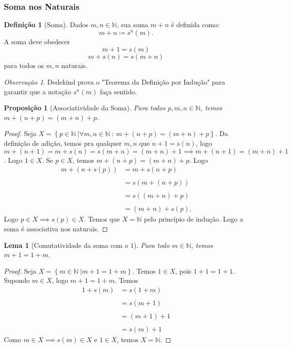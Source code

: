 \documentclass{article}
\theoremstyle{plain}
\newtheorem{prop}{Proposição}[section]
\newtheorem{lema}{Lema}
\theoremstyle{definition}
\newtheorem{definicao}{Definição}[section]
\theoremstyle{remark}
\newtheorem{obs}{Observação}[section]
\begin{document}
\subsubsection{Soma nos Naturais}
\begin{definicao}[Soma]
	Dados $m,n\in \mathbb{N}$, sua soma $m+n$ é definida como:$$ m+n \coloneqq s^n(m).$$ A soma deve obedecer \begin{equation} m+1 = s(m)\end{equation} \begin{equation}m +s(n) = s(m+n)\end{equation}  para todos os $m,n$ naturais.
\end{definicao}
\begin{obs}
	Dedekind prova o "Teorema da Definição por Indução" para garantir que a notação $s^n(m)$ faça sentido.
\end{obs}
\begin{prop}[Associatividade da Soma]
	Para todos $p,m,n \in \mathbb{N}$, temos $m+(n+p) = (m+n) +p$.
\end{prop}
\begin{proof}
	Seja $X = \left\{ p \in \mathbb{N} \: | \forall m,n\in \mathbb{N} \: : \: m+(n+p) = (m+n) + p \right\}$. Da definição de adição, temos pra qualquer $m,n$ que $n+1 = s(n)$, logo $m+(n+1)  = m+s(n) = s(m+n) = (m+n) +1 \implies m+(n+1) = (m+n) +1 $. Logo $1\in X$.  Se $p \in X$, temos $m+(n+p) = (m+n) +p $. Logo \begin{align*} 
		m+(n+s(p)) &= m+ s(n+p) \\~\\
		&= s\left(m+(n+p)\right) \\~\\ 
		&= s\left((m+n)+p\right) \\~\\ 
		&= (m+n) + s(p).
	\end{align*}
	Logo $p \in X \implies s(p) \in X$. Temos que $X =  \mathbb{N}$ pelo princípio de indução. Logo a soma é associativa nos naturais.
\end{proof}
\begin{lema}[Comutatividade da soma com o $1$]
	\label{lema1}
	Para todo $m \in \mathbb{N}$, temos $m+1 = 1 +m$.
\end{lema}
\begin{proof}
	Seja $X = \left\{ m \in \mathbb{N} \: |  m+1 = 1+m \right\}$. Temos $1\in X$, pois $1+1 = 1+1$. Supondo $m\in X$, logo $m+1 = 1+m$. Temos \begin{align*} 
		1+ s(m)  &= s(1+m) \\~ \\
		&= s(m+1) \\~\\
		&= (m+1) +1 \\~\\
		&= s(m)+1
	\end{align*}
	Como $m\in X \implies s(m) \in X$ e $1\in X$, temos $X= \mathbb{N}$.
\end{proof}
\end{document}

